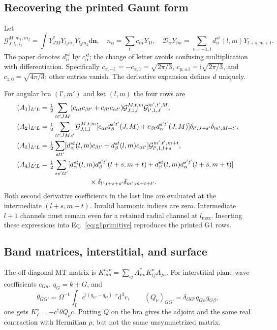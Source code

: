 \documentclass[11pt]{article}
\newcommand{\dd}{\mathrm d}
\newcommand{\ii}{\mathrm i}
\begin{document}
\subsection{Recovering the printed Gaunt form}
Let
\begin{equation}
 \mathcal G_{J,l_1,l_2}^{M,m_1,m_2}=\int Y_{JM}^*Y_{l_1m_1}Y_{l_2m_2}\dd\bm n,
 \quad n_\alpha=\sum_t c_{\alpha t}Y_{1t},\quad
 \mathcal D_\alpha Y_{lm}=\sum_{s=\pm1,t}d_\alpha^{st}(l,m)Y_{l+s,m+t}.
\end{equation}
The paper denotes $d_\alpha^{st}$ by $c_\alpha^{st}$; the change of letter avoids confusing multiplication with differentiation. Specifically $c_{x,-1}=-c_{x,1}=\sqrt{2\pi/3}$, $c_{y,\pm1}=\ii\sqrt{2\pi/3}$, and $c_{z,0}=\sqrt{4\pi/3}$; other entries vanish. The derivative expansion defines $d$ uniquely.

For angular bra $(l',m')$ and ket $(l,m)$ the four rows are
\begin{align}
 (A_1)_{L'L}&=\tfrac12\sum_{tt'JM}(c_{\alpha t}c_{\beta t'}+c_{\beta t}c_{\alpha t'})
 \mathcal G_{J,1,l}^{M,t,m}\mathcal G_{l',1,J}^{m',t',M},\\
 (A_2)_{L'L}&=\tfrac12\sum_{tt'JM s'}\mathcal G_{J,1,l}^{M,t,m}
 [c_{\alpha t}d_\beta^{s't'}(J,M)+c_{\beta t}d_\alpha^{s't'}(J,M)]
 \delta_{l',J+s'}\delta_{m',M+t'},\\
 (A_3)_{L'L}&=\tfrac12\sum_{stt'}[d_\alpha^{st}(l,m)c_{\beta t'}+d_\beta^{st}(l,m)c_{\alpha t'}]
 \mathcal G_{l',1,l+s}^{m',t',m+t},\\
 (A_4)_{L'L}&=\tfrac12\sum_{ss'tt'}[d_\alpha^{st}(l,m)d_\beta^{s't'}(l+s,m+t)
 +d_\beta^{st}(l,m)d_\alpha^{s't'}(l+s,m+t)]\nonumber\\
 &\hspace{25mm}\times\delta_{l',l+s+s'}\delta_{m',m+t+t'}.
\end{align}
Both second derivative coefficients in the last line are evaluated at the intermediate $(l+s,m+t)$. Invalid harmonic indices are zero. Intermediate $l+1$ channels must remain even for a retained radial channel at $l_{\max}$. Inserting these expressions into Eq.~\eqref{eq:g1primitive} reproduces the printed G1 rows.

\subsection{Band matrices, interstitial, and surface}
The off-diagonal MT matrix is $K^{a,\nu}_{mn}=\sum_{ij}A_{im}^*K^\nu_{ij}A_{jn}$. For interstitial plane-wave coefficients $c_{Gn}$, $q_G=k+G$, and
\begin{equation}
 \theta_{GG'}=\Omega^{-1}\int_Ie^{\ii(q_{G'}-q_G)\cdot r}\dd^3r,\qquad
 (Q_\nu)_{GG'}=\delta_{GG'}q_{G\alpha}q_{G\beta},
\end{equation}
one gets $K_I^\nu=-c^\dagger\theta Q_\nu c$. Putting $Q$ on the bra gives the adjoint and the same real contraction with Hermitian $\rho$, but not the same unsymmetrized matrix.
\end{document}

